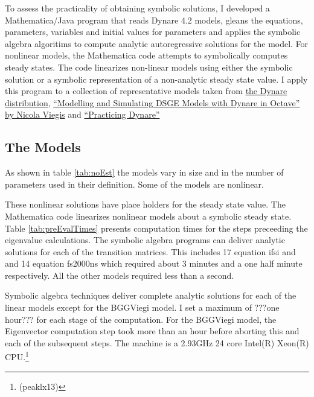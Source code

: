 \documentclass[12pt]{article}
\begin{document}
To assess the practicality of obtaining symbolic solutions, I developed
a Mathematica/Java program that
reads  Dynare 4.2 models, gleans the equations,  parameters, 
variables and   initial values for parameters and 
applies the symbolic algebra algoritims to compute analytic 
autoregressive solutions for the model.
For nonlinear models, the Mathematica  code attempts to symbolically computes 
steady states. The code 
linearizes non-linear models using either the symbolic solution or a 
symbolic representation of a non-analytic steady state value.
I apply this program to a collection of representative models taken from 
\href{http://www.dynare.org/documentation-and-support/faq/basics}{the Dynare distribution,}
\href{http://www.nviegi.net/research/dsge.htm}{``Modelling and Simulating DSGE Models with Dynare in Octave'' by Nicola Viegis} and 
\href{http://homepages.nyu.edu/~ts43/research/AP_tom16.pdf}{``Practicing Dynare''\cite{bhandari10}}


    \subsection{The Models }
As shown in table \ref{tab:noEst} the models vary in size and in the number of parameters used in their
definition. Some of the models are nonlinear.



  These nonlinear solutions have place holders for the steady state value.
The Mathematica code linearizes nonlinear models about a symbolic steady state.
Table \ref{tab:preEvalTimes} presents computation times for the steps
preceeding the eigenvalue calculations.
The symbolic algebra programs can deliver analytic solutions for
each of the transition matrices. This includes 17 equation ifsi and and 14 equation fs2000ns which required
about 3 minutes and a one half minute respectively. All the other models required less than a second.







Symbolic algebra techniques deliver complete 
analytic solutions for each of the linear
models except for the BGGViegi model. 
I set a maximum of ???one hour??? for each stage of the computation.
For the BGGViegi model, the Eigenvector computation 
step took more than an hour before aborting this and each of the subsequent 
steps.  
The machine is a 2.93GHz  24 core
Intel(R) Xeon(R) CPU.\footnote{(peaklx13)}
\end{document}
